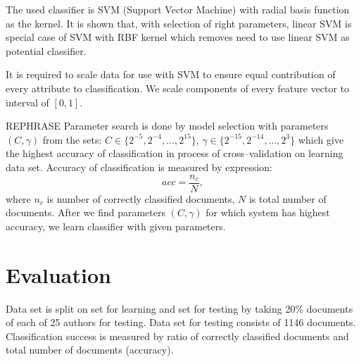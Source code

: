 \documentclass[11pt,english]{article}
\begin{document}
\begin{multicols}{2}
The used classifier is SVM (Support Vector Machine) with radial basis
function as the kernel. It is shown that, with selection of right parameters, linear
SVM is special case of SVM with RBF kernel \citep{keerthi2003asymptotic} which
removes need to use linear SVM as potential classifier.

It is required to scale data for use with SVM to ensure equal contribution of
every attribute to classification. We scale components of every feature vector
to interval of $[0, 1]$.

REPHRASE Parameter search is done by model selection with parameters $(C, \gamma)$ from
the sets: $C \in \{2^{-5}, 2^{-4}, \ldots , 2^{15}\}$, $\gamma \in \{2^{-15}, 2^{-14}, \ldots, 2^3\}$ \citep{CC01a} which give the highest accuracy of
classification in process of cross--validation on learning data set. Accuracy
of classification is measured by expression:
\begin{equation}
acc = \frac{n_c}{N}, %
\end{equation}
where $n_c$ is number of correctly classified documents, $N$ is total number of
documents. After we find parameters $(C, \gamma)$ for which system has highest
accuracy, we learn classifier with given parameters.


\section{Evaluation}
\label{sec:evaluacija}
Data set is split on set for learning and set for testing by taking 20\%
documents of each of 25 authors for testing. Data set for testing consists of
1146 documents. Classification success is measured by ratio of correctly
classified documents and total number of documents (accuracy).


\end{multicols}
\end{document}
